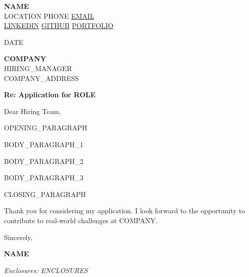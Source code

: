 \documentclass[11pt,a4paper]{letter}
\begin{document}
\begin{center}
    {\LARGE \textbf{ {{NAME}} }}\\[0.3cm]
     {{LOCATION}} \quad
     {{PHONE}} \quad
     \href{mailto:{{EMAIL}}}{{{EMAIL}}}\\[0.2cm]
     \href{https://{{LINKEDIN}}}{{{LINKEDIN}}} \quad
     \href{https://{{GITHUB}}}{{{GITHUB}}} \quad
     \href{https://{{PORTFOLIO}}}{{{PORTFOLIO}}}
\end{center}

\vspace{0.5cm}

{{DATE}}

\vspace{0.5cm}

\textbf{ {{COMPANY}} }\\
{{HIRING_MANAGER}}\\
{{COMPANY_ADDRESS}}

\vspace{0.5cm}

\textbf{Re: Application for {{ROLE}}}

\vspace{0.5cm}

Dear Hiring Team,

{{OPENING_PARAGRAPH}}

{{BODY_PARAGRAPH_1}}

{{BODY_PARAGRAPH_2}}

{{BODY_PARAGRAPH_3}}

{{CLOSING_PARAGRAPH}}

Thank you for considering my application. I look forward to the opportunity to contribute to real-world challenges at {{COMPANY}}.

\vspace{0.5cm}

Sincerely,

\vspace{0.8cm}

\textbf{ {{NAME}} }

\vspace{0.5cm}

\textit{Enclosures: {{ENCLOSURES}}}
\end{document}
